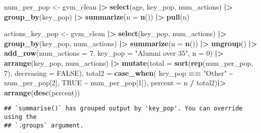 \documentclass[
]{article}
\newenvironment{Shaded}{\begin{snugshade}}{\end{snugshade}}
\newcommand{\AttributeTok}[1]{\textcolor[rgb]{0.13,0.29,0.53}{#1}}
\newcommand{\ConstantTok}[1]{\textcolor[rgb]{0.56,0.35,0.01}{#1}}
\newcommand{\DecValTok}[1]{\textcolor[rgb]{0.00,0.00,0.81}{#1}}
\newcommand{\FunctionTok}[1]{\textcolor[rgb]{0.13,0.29,0.53}{\textbf{#1}}}
\newcommand{\NormalTok}[1]{#1}
\newcommand{\OtherTok}[1]{\textcolor[rgb]{0.56,0.35,0.01}{#1}}
\newcommand{\SpecialCharTok}[1]{\textcolor[rgb]{0.81,0.36,0.00}{\textbf{#1}}}
\newcommand{\StringTok}[1]{\textcolor[rgb]{0.31,0.60,0.02}{#1}}
\begin{document}
\begin{Shaded}
\begin{Highlighting}[]
\NormalTok{num\_per\_pop }\OtherTok{\textless{}{-}}\NormalTok{ gvm\_clean }\SpecialCharTok{|\textgreater{}}
  \FunctionTok{select}\NormalTok{(age, key\_pop, num\_actions) }\SpecialCharTok{|\textgreater{}}
  \FunctionTok{group\_by}\NormalTok{(key\_pop) }\SpecialCharTok{|\textgreater{}}
  \FunctionTok{summarize}\NormalTok{(}\AttributeTok{n =} \FunctionTok{n}\NormalTok{()) }\SpecialCharTok{|\textgreater{}}
  \FunctionTok{pull}\NormalTok{(n)}

\NormalTok{actions\_key\_pop }\OtherTok{\textless{}{-}}\NormalTok{ gvm\_clean }\SpecialCharTok{|\textgreater{}}
  \FunctionTok{select}\NormalTok{(key\_pop, num\_actions) }\SpecialCharTok{|\textgreater{}}
  \FunctionTok{group\_by}\NormalTok{(key\_pop, num\_actions) }\SpecialCharTok{|\textgreater{}}
  \FunctionTok{summarize}\NormalTok{(}\AttributeTok{n =} \FunctionTok{n}\NormalTok{()) }\SpecialCharTok{|\textgreater{}}
  \FunctionTok{ungroup}\NormalTok{() }\SpecialCharTok{|\textgreater{}}
  \FunctionTok{add\_row}\NormalTok{(}\AttributeTok{num\_actions =} \DecValTok{7}\NormalTok{, }\AttributeTok{key\_pop =} \StringTok{"Alumni over 35"}\NormalTok{, }\AttributeTok{n =} \DecValTok{0}\NormalTok{) }\SpecialCharTok{|\textgreater{}}
  \FunctionTok{arrange}\NormalTok{(key\_pop, num\_actions) }\SpecialCharTok{|\textgreater{}}
  \FunctionTok{mutate}\NormalTok{(}\AttributeTok{total =} \FunctionTok{sort}\NormalTok{(}\FunctionTok{rep}\NormalTok{(num\_per\_pop, }\DecValTok{7}\NormalTok{), }\AttributeTok{decreasing =} \ConstantTok{FALSE}\NormalTok{),}
         \AttributeTok{total2 =} \FunctionTok{case\_when}\NormalTok{(}
\NormalTok{           key\_pop }\SpecialCharTok{==} \StringTok{"Other"} \SpecialCharTok{\textasciitilde{}}\NormalTok{ num\_per\_pop[}\DecValTok{2}\NormalTok{],}
           \ConstantTok{TRUE} \SpecialCharTok{\textasciitilde{}}\NormalTok{ num\_per\_pop[}\DecValTok{1}\NormalTok{]),}
         \AttributeTok{percent =}\NormalTok{ n }\SpecialCharTok{/}\NormalTok{ total2)}\SpecialCharTok{|\textgreater{}}
  \FunctionTok{arrange}\NormalTok{(}\FunctionTok{desc}\NormalTok{(percent)) }
\end{Highlighting}
\end{Shaded}

\begin{verbatim}
## `summarise()` has grouped output by 'key_pop'. You can override using the
## `.groups` argument.
\end{verbatim}
\end{document}
